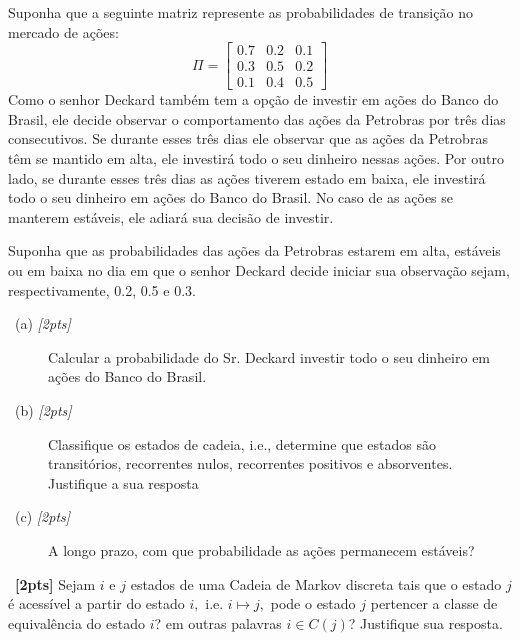 \documentclass[a4paper,12pt,oneside,twocolumn]{Config/milktest}
\begin{document}
Suponha que a seguinte matriz represente as probabilidades de transição no mercado de ações:
$$
\Pi = \begin{bmatrix}
0.7 & 0.2 & 0.1 \\
0.3 & 0.5 & 0.2 \\
0.1 & 0.4 & 0.5
\end{bmatrix}
$$
Como o senhor Deckard também tem a opção de investir em ações do Banco do Brasil, ele decide observar o comportamento das ações da Petrobras por três dias consecutivos. Se durante esses três dias ele observar que as ações da Petrobras têm se mantido em alta, ele investirá todo o seu dinheiro nessas ações. Por outro lado, se durante esses três dias as ações tiverem estado em baixa, ele investirá todo o seu dinheiro em ações do Banco do Brasil. No caso de as ações se manterem estáveis, ele adiará sua decisão de investir.

Suponha que as probabilidades das ações da Petrobras estarem em alta, estáveis ou em baixa no dia em que o senhor Deckard decide iniciar sua observação sejam, respectivamente, 0.2, 0.5 e 0.3.


\begin{description}
\item[ \ (a) \textit{[2pts]}] Calcular a probabilidade do Sr. Deckard investir todo o seu dinheiro em ações do Banco do Brasil.
\item[ \ (b) \textit{[2pts]}] Classifique os estados de cadeia, i.e., determine que estados são transitórios, recorrentes nulos, recorrentes positivos e absorventes. Justifique a sua resposta
\item[ \ (c) \textit{[2pts]}] A longo prazo, com que probabilidade as ações permanecem estáveis?
\end{description}




\medskip 
\question~\textbf{[2pts]} Sejam $i$ e $j$ estados de uma Cadeia de Markov discreta tais que  o estado $j$ é acessível a partir do estado $i,$ i.e. $i \longmapsto j,$ pode o estado $j$ pertencer a classe de equivalência do estado $i$? em outras palavras $i  \in C(j)$? Justifique sua resposta. 


\bigskip


\centering\color{cor}{\scshape boa prova}


% 

% 

% 

% 
\end{document}
